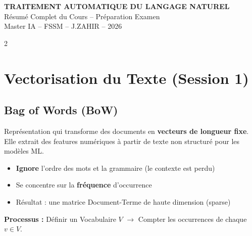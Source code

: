 \documentclass[a4paper,10pt]{article}
\begin{document}
\begin{tcolorbox}[colback=primary, colframe=primary, sharp corners]
  \centering
  \vspace{4pt}
  {\Huge\bfseries\color{white} TRAITEMENT AUTOMATIQUE DU LANGAGE NATUREL}\\[6pt]
  {\Large\color{white} Résumé Complet du Cours -- Préparation Examen}\\[4pt]
  {\normalsize\color{lightblue} Master IA -- FSSM -- J.ZAHIR -- 2026}
  \vspace{4pt}
\end{tcolorbox}

\vspace{4pt}

\begin{multicols}{2}
\tableofcontents
\end{multicols}

\vspace{6pt}

\section{Vectorisation du Texte (Session 1)}

\subsection{Bag of Words (BoW)}

\begin{definitionbox}
Représentation qui transforme des documents en \textbf{vecteurs de longueur fixe}. Elle extrait des features numériques à partir de texte non structuré pour les modèles ML.
\begin{itemize}
  \item \textbf{Ignore} l'ordre des mots et la grammaire (le contexte est perdu)
  \item Se concentre sur la \textbf{fréquence} d'occurrence
  \item Résultat : une matrice Document-Terme de haute dimension (sparse)
\end{itemize}
\end{definitionbox}

\textbf{Processus :} Définir un Vocabulaire $V$ $\rightarrow$ Compter les occurrences de chaque $v \in V$.
\end{document}
